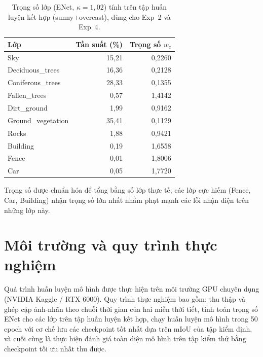 \begin{table}[H]
\centering
\caption{Trọng số lớp (ENet, $\kappa=1{,}02$) tính trên tập huấn luyện kết hợp (sunny+overcast), dùng cho Exp~2 và Exp~4.}
\label{tab:weights}
\small
\begin{tabular}{l r r}
\toprule
\textbf{Lớp} & \textbf{Tần suất (\%)} & \textbf{Trọng số $w_c$} \\
\midrule
Sky                & 15{,}21 & 0{,}2260 \\
Deciduous\_trees   & 16{,}36 & 0{,}2128 \\
Coniferous\_trees  & 28{,}33 & 0{,}1355 \\
Fallen\_trees      & 0{,}57  & 1{,}4142 \\
Dirt\_ground       & 1{,}99  & 0{,}9162 \\
Ground\_vegetation & 35{,}41 & 0{,}1129 \\
Rocks              & 1{,}88  & 0{,}9421 \\
Building           & 0{,}19  & 1{,}6558 \\
Fence              & 0{,}01  & 1{,}8006 \\
Car                & 0{,}05  & 1{,}7720 \\
\bottomrule
\end{tabular}
\end{table}
{\footnotesize Trọng số được chuẩn hóa để tổng bằng số lớp thực tế; các lớp cực hiếm (Fence, Car, Building) nhận trọng số lớn nhất nhằm phạt mạnh các lỗi nhận diện trên những lớp này.}

\section{Môi trường và quy trình thực nghiệm}

Quá trình huấn luyện mô hình được thực hiện trên môi trường GPU chuyên dụng (NVIDIA Kaggle / RTX 6000). Quy trình thực nghiệm bao gồm: thu thập và ghép cặp ảnh-nhãn theo chuỗi thời gian của hai miền thời tiết, tính toán trọng số ENet cho các lớp trên tập huấn luyện kết hợp, chạy huấn luyện mô hình trong 50 epoch với cơ chế lưu các checkpoint tốt nhất dựa trên mIoU của tập kiểm định, và cuối cùng là thực hiện đánh giá toàn diện mô hình trên tập kiểm thử bằng checkpoint tối ưu nhất thu được.
